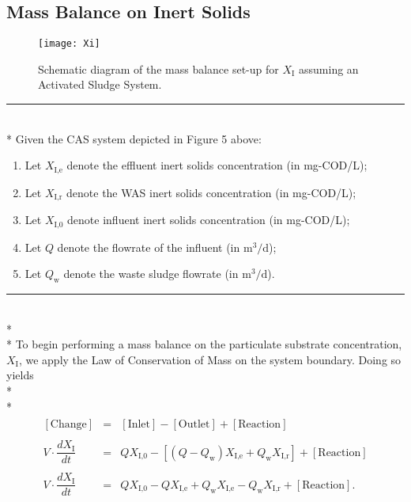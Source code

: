 \documentclass[]{article}
\begin{document}
\subsection{Mass Balance on Inert Solids}
\vspace{0.25cm}
\begin{figure}[H]
	\centering
	\texttt{[image: Xi]}
	\caption{Schematic diagram of the mass balance set-up for $X_{\text{I}}$ assuming an Activated Sludge System.}
\end{figure} 
\par\noindent\rule{\textwidth}{0.4pt} \vspace{0.1 cm} \\*
Given the CAS system depicted in Figure 5 above: \vspace{0.05 cm} \begin{enumerate}[label=(\roman*)]
	\item Let $X_{\text{I,e}}$ denote the effluent inert solids concentration (in mg-COD/L);
	\item Let $X_{\text{I,r}}$ denote the WAS inert solids concentration (in mg-COD/L);
	\item Let $X_{\text{I,0}}$ denote influent inert solids concentration (in mg-COD/L);
	\item Let $Q$ denote the flowrate of the influent (in $\text{m}^3/\text{d}$);
	\item Let $Q_{\text{w}}$ denote the waste sludge flowrate (in $\text{m}^3/\text{d}$).
\end{enumerate}
\par\noindent\rule{\textwidth}{0.4pt} \\* \\*
\noindent To begin performing a mass balance on the particulate substrate concentration, $X_{\text{I}}$, we apply the Law of Conservation of Mass on the system boundary. Doing so yields \\* \\*
\begin{align}
\begin{array}{rcl}
[\text{Change}] &=& [\text{Inlet}] - [\text{Outlet}] + [\text{Reaction}] \\ \\
V \cdot \dfrac{dX_{\text{I}}}{dt} &=& QX_{\text{I,0}} - [(Q-Q_{\text{w}})X_{\text{I,e}} + Q_{\text{w}}X_{\text{I,r}}] + [\text{Reaction}] \\ \\
V \cdot \dfrac{dX_{\text{I}}}{dt} &=& QX_{\text{I,0}} - QX_{\text{I,e}} + Q_{\text{w}}X_{\text{I,e}} - Q_{\text{w}}X_{\text{I,r}} + [\text{Reaction}].
\end{array}
\end{align}
\end{document}
